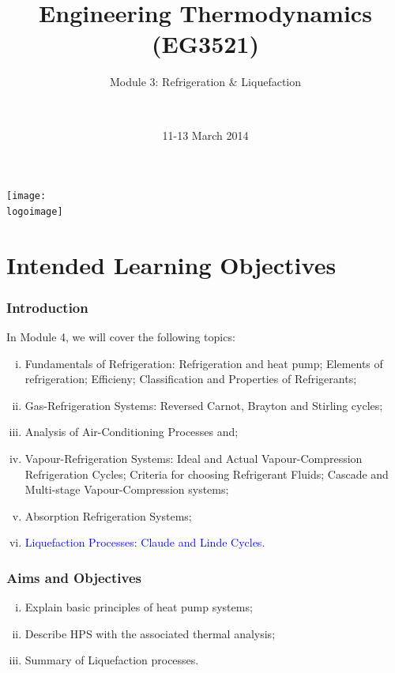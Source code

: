 \documentclass[10pt,compress]{beamer}
\institute{School of Engineering}
\title{Engineering Thermodynamics (EG3521)}
\subtitle{Module 3: Refrigeration $\&$ Liquefaction}
\date[11-13/03/2014]{11-13 March 2014}
\author[\shortname]{%
  \fullname\\\ttfamily{\emailaddress}
}
\newcommand{\logoimage}{../FigBanner/UoAHorizBanner}
\begin{document}
\begin{frame}
  \titlepage
  \vfill%
  \begin{center}
    \texttt{[image: \\logoimage]}
  \end{center}
\end{frame}





\section{Intended Learning Objectives}
\begin{frame}
 \frametitle{Introduction}
  In Module 4, we will cover the following topics:
  \begin{enumerate}[(i)]
   \item <1-> Fundamentals of Refrigeration: Refrigeration and heat pump; Elements of refrigeration; Efficieny; Classification and Properties of Refrigerants;
   \item <1-> Gas-Refrigeration Systems: Reversed Carnot, Brayton and Stirling cycles;
   \item <1-> Analysis of Air-Conditioning Processes and;
   \item <1-> Vapour-Refrigeration Systems: Ideal and Actual Vapour-Compression Refrigeration Cycles; Criteria for choosing Refrigerant Fluids; Cascade and Multi-stage Vapour-Compression systems;
   \item <1-> Absorption Refrigeration Systems;
   \item <3-> \textcolor{blue}{Liquefaction Processes: Claude and Linde Cycles.}
  \end{enumerate}
\end{frame}

\begin{frame}
 \frametitle{Aims and Objectives}
  \begin{enumerate}[(i)]
   \item <1-> Explain basic principles of heat pump systems;
   \item <2-> Describe HPS with the associated thermal analysis;
   \item <3-> Summary of Liquefaction processes.
  \end{enumerate}
\end{frame}
\end{document}
